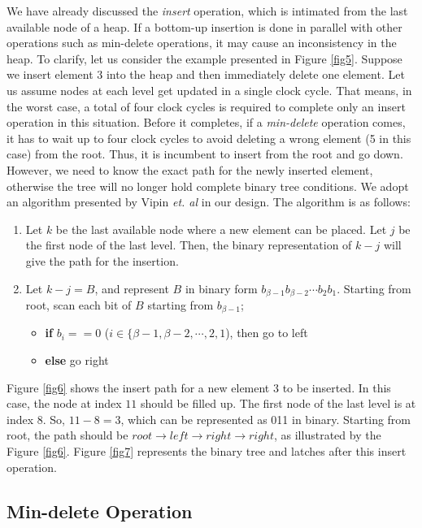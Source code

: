 \documentclass[10pt, conference, compsocconf]{IEEEtran}
\begin{document}
We have already discussed the {\it insert} operation, which is intimated from the last available node of a heap.
If a bottom-up insertion is done in parallel with other operations such as min-delete operations, it may cause an inconsistency in the heap.
To clarify, let us consider the example presented in Figure \ref{fig5}.
Suppose we insert element $3$ into the heap and then immediately delete one element.
Let us assume nodes at each level get updated in a single clock cycle.
That means, in the worst case, a total of four clock cycles is required to complete only an insert operation in this situation.
Before it completes, if a {\it min-delete} operation comes, it has to wait up to four clock cycles to avoid deleting a wrong element (5 in this case) from the root.
Thus, it is incumbent to insert from the root and go down.
However, we need to know the exact path for the newly inserted element, otherwise the tree will no longer hold complete binary tree conditions.
We adopt an algorithm presented by Vipin {\it et. al} \cite{pq6} in our design. The algorithm is as follows:

\begin{enumerate}
\item Let $k$ be the last available node where a new element can be placed. Let $j$ be the first node of the last level. Then, the binary representation of $k-j$ will give the path for the insertion.
\item Let $k-j = B$, and represent $B$ in binary form $b_{\beta-1}b_{\beta-2} \cdots b_2b_1$. Starting from root, scan each bit of $B$ starting from $b_{\beta-1}$;
    \begin{itemize}
    \item {\bf if} $b_i == 0$ ($i \in \{\beta-1,\beta-2, \cdots, 2,1$), then go to left
    \item {\bf else} go right
    \end{itemize}
\end{enumerate}

Figure \ref{fig6} shows the insert path for a new element $3$ to be inserted. In this case, the node at index $11$ should be filled up.
The first node of the last level is at index $8$.
So, $11 - 8 = 3$, which can be represented as 011 in binary.
Starting from root, the path should be $root \rightarrow left \rightarrow right \rightarrow right$, as illustrated by the Figure \ref{fig6}. Figure \ref{fig7} represents the binary tree and latches after this insert operation.

\subsection{Min-delete Operation}
\end{document}

